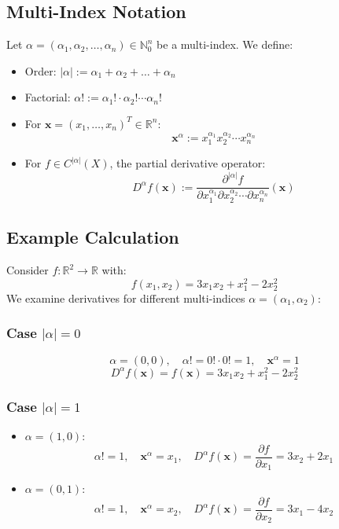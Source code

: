 \documentclass{article}
\begin{document}
\subsection*{Multi-Index Notation}
Let \( \alpha = (\alpha_1, \alpha_2, \dots, \alpha_n) \in \mathbb{N}_0^n \) be a multi-index. We define:
\begin{itemize}
    \item Order: \( |\alpha| := \alpha_1 + \alpha_2 + \dots + \alpha_n \)
    \item Factorial: \( \alpha! := \alpha_1! \cdot \alpha_2! \cdots \alpha_n! \)
    \item For \( \bm{x} = (x_1, \dots, x_n)^T \in \mathbb{R}^n \):
    \[
    \bm{x}^\alpha := x_1^{\alpha_1} x_2^{\alpha_2} \cdots x_n^{\alpha_n}
    \]
    \item For \( f \in C^{|\alpha|}(X) \), the partial derivative operator:
    \[
    D^\alpha f(\bm{x}) := \frac{\partial^{|\alpha|} f}{\partial x_1^{\alpha_1} \partial x_2^{\alpha_2} \cdots \partial x_n^{\alpha_n}} (\bm{x})
    \]
\end{itemize}
\newpage
\subsection*{Example Calculation}
Consider \( f: \mathbb{R}^2 \to \mathbb{R} \) with:
\[
f(x_1, x_2) = 3x_1x_2 + x_1^2 - 2x_2^2
\]
We examine derivatives for different multi-indices \( \alpha = (\alpha_1, \alpha_2) \):

\subsubsection{Case \( |\alpha| = 0 \)}
\[
\alpha = (0, 0), \quad \alpha! = 0! \cdot 0! = 1, \quad \bm{x}^\alpha = 1
\]
\[
D^\alpha f(\bm{x}) = f(\bm{x}) = 3x_1x_2 + x_1^2 - 2x_2^2
\]

\subsubsection{Case \( |\alpha| = 1 \)}
\begin{itemize}
    \item \( \alpha = (1, 0) \):
    \[
    \alpha! = 1, \quad \bm{x}^\alpha = x_1, \quad D^\alpha f(\bm{x}) = \frac{\partial f}{\partial x_1} = 3x_2 + 2x_1
    \]
    \item \( \alpha = (0, 1) \):
    \[
    \alpha! = 1, \quad \bm{x}^\alpha = x_2, \quad D^\alpha f(\bm{x}) = \frac{\partial f}{\partial x_2} = 3x_1 - 4x_2
    \]
\end{itemize}
\end{document}
